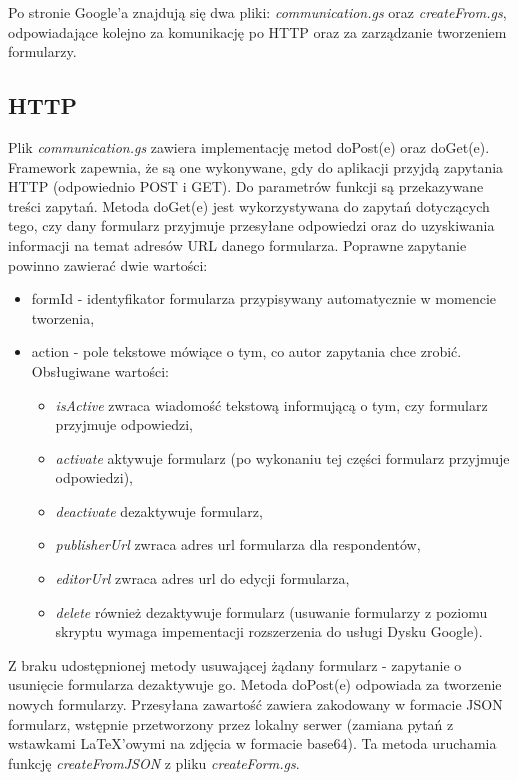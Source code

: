 \ind Po stronie Google'a znajdują się dwa pliki: \textit{communication.gs} oraz \textit{createFrom.gs}, odpowiadające kolejno za komunikację po HTTP oraz za zarządzanie tworzeniem formularzy. 
\subsection{HTTP}
Plik \textit{communication.gs} zawiera implementację metod doPost(e) oraz doGet(e). Framework zapewnia, że są one wykonywane, gdy do aplikacji przyjdą zapytania HTTP (odpowiednio POST i GET). Do parametrów funkcji są przekazywane treści zapytań.
\ind Metoda doGet(e) jest wykorzystywana do zapytań dotyczących tego, czy dany formularz przyjmuje przesyłane odpowiedzi oraz do uzyskiwania informacji na temat adresów URL danego formularza.  Poprawne zapytanie powinno zawierać dwie wartości:
\begin{itemize}
\item formId - identyfikator formularza przypisywany automatycznie w momencie tworzenia,
\item action - pole tekstowe mówiące o tym, co autor zapytania chce zrobić. Obsługiwane wartości:
\begin{itemize}
\item \textit{isActive} zwraca wiadomość tekstową informującą o tym, czy formularz przyjmuje odpowiedzi,
\item \textit{activate} aktywuje formularz (po wykonaniu tej części formularz przyjmuje odpowiedzi),
\item \textit{deactivate} dezaktywuje formularz,
\item \textit{publisherUrl} zwraca adres url formularza dla respondentów,
\item \textit{editorUrl} zwraca adres url do edycji formularza,
\item \textit{delete} również dezaktywuje formularz (usuwanie formularzy z poziomu skryptu wymaga impementacji rozszerzenia do usługi Dysku Google).
\end{itemize}
\end{itemize}
Z braku udostępnionej metody usuwającej żądany formularz - zapytanie o usunięcie formularza dezaktywuje go. 
\ind Metoda doPost(e) odpowiada  za tworzenie nowych formularzy. Przesyłana zawartość zawiera zakodowany w formacie JSON formularz, wstępnie przetworzony przez lokalny serwer (zamiana pytań z wstawkami \LaTeX{}'owymi na zdjęcia w formacie base64). Ta metoda uruchamia funkcję \textit{createFromJSON} z pliku \textit{createForm.gs}.
